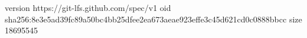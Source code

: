 version https://git-lfs.github.com/spec/v1
oid sha256:8e3e5ad39fc89a50bc4bb25dfee2ea673aeae923effe3c45d621cd0c0888bbcc
size 18695545
